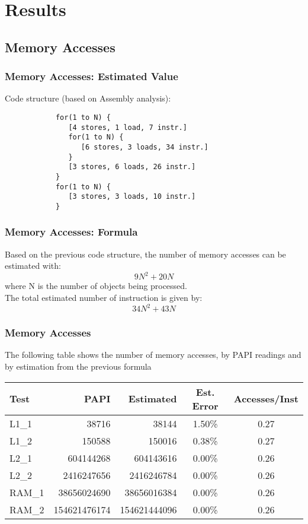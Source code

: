 \documentclass{beamer}
\begin{document}
\section{Results}
\subsection{Memory Accesses}

\begin{frame}[fragile]
	\frametitle{Memory Accesses: Estimated Value}

	Code structure (based on Assembly analysis):
	\\
	\begin{center}
		\begin{lstlisting}
			for(1 to N) {
			   [4 stores, 1 load, 7 instr.]
			   for(1 to N) {
			      [6 stores, 3 loads, 34 instr.]
			   }
			   [3 stores, 6 loads, 26 instr.]
			}
			for(1 to N) {
			   [3 stores, 3 loads, 10 instr.]
			}
		\end{lstlisting}
	\end{center}
\end{frame}

\begin{frame}
	\frametitle{Memory Accesses: Formula}

	Based on the previous code structure, the number of memory accesses can be estimated with:
	$$9N^{2} + 20N$$
	where N is the number of objects being processed.
	\\
	The total estimated number of instruction is given by:
	$$34N^{2} + 43N$$
\end{frame}

\begin{frame}
	\frametitle{Memory Accesses}

	The following table shows the number of memory accesses, by PAPI readings and by estimation from the previous formula

	\begin{table}[!htp]
		\begin{center}
		{\small
			\begin{tabular}{|l|r|r|c|c|}

				\hline
				Test	&	PAPI					&	Estimated					&	Est. Error			&	 Accesses/Inst		\\
				\hline
				L1\_1	&	38716					&	38144						&	1.50\%				&	0.27						\\
				L1\_2	&	150588					&	150016						&	0.38\%				&	0.27						\\
				L2\_1	&	604144268				&	604143616					&	0.00\%				&	0.26						\\
				L2\_2	&	2416247656				&	2416246784					&	0.00\%				&	0.26						\\
				RAM\_1	&	38656024690				&	38656016384					&	0.00\%				&	0.26						\\
				RAM\_2	&	154621476174			&	154621444096				&	0.00\%				&	0.26						\\
				\hline
			\end{tabular}
		}
		\end{center}
	\end{table}
\end{frame}
\end{document}
